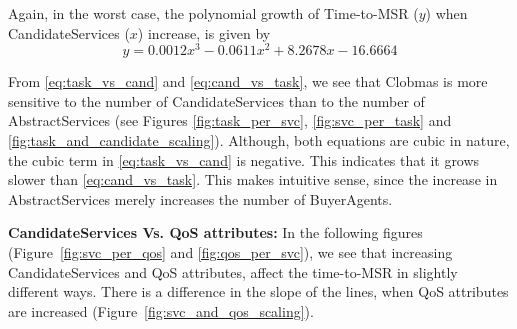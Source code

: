 \documentclass[10pt,journal,compsoc]{IEEEtran}
\begin{document}
Again, in the worst case, the polynomial growth of Time-to-MSR ($y$) when CandidateServices ($x$) increase, is given by
\begin{equation}
    y =  0.0012x^{3} - 0.0611x^{2} +  8.2678x - 16.6664 \label{eq:cand_vs_task}
\end{equation}

From \autoref{eq:task_vs_cand} and \autoref{eq:cand_vs_task}, we see that Clobmas is more sensitive to the number of CandidateServices than to the number of AbstractServices (see Figures \ref{fig:task_per_svc}, \ref{fig:svc_per_task} and \ref{fig:task_and_candidate_scaling}). Although, both equations are cubic in nature, the cubic term in \autoref{eq:task_vs_cand} is negative. This indicates that it grows slower than \autoref{eq:cand_vs_task}. This makes intuitive sense, since the increase in AbstractServices merely increases the number of BuyerAgents. 

\textbf{CandidateServices Vs. QoS attributes:}
In the following figures (Figure~\ref{fig:svc_per_qos} and \ref{fig:qos_per_svc}), we see that increasing CandidateServices and QoS attributes, affect the time-to-MSR in slightly different ways. There is a difference in the slope of the lines, when QoS attributes are increased (Figure~\ref{fig:svc_and_qos_scaling}).
\end{document}
